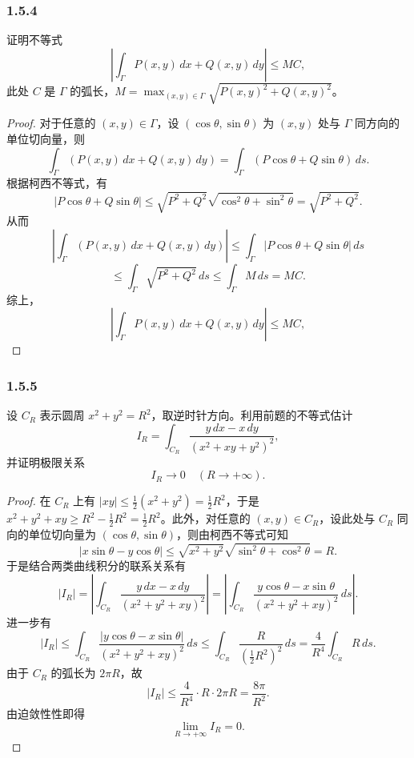 \documentclass[12pt]{ctexart}
\begin{document}
\subsubsection*{1.5.4}
证明不等式
\[
\left| \int_\Gamma P(x, y) \, dx + Q(x, y) \, dy \right| \leq M C,
\]
此处 $C$ 是 $\Gamma$ 的弧长，$M = \max_{(x, y) \in \Gamma} \sqrt{P(x, y)^2 + Q(x, y)^2}$。

\begin{proof}
	对于任意的 $(x, y) \in \Gamma$，设 $(\cos \theta, \sin \theta)$ 为 $(x, y)$ 处与 $\Gamma$ 同方向的单位切向量，则
\[
\int_\Gamma \left( P(x, y) \, dx + Q(x, y) \, dy \right) = \int_\Gamma \left( P \cos \theta + Q \sin \theta \right) \, ds.
\]
根据柯西不等式，有
\[
|P \cos \theta + Q \sin \theta| \leq \sqrt{P^2 + Q^2} \sqrt{\cos^2 \theta + \sin^2 \theta} = \sqrt{P^2 + Q^2}.
\]
从而
\[
\left| \int_\Gamma \left( P(x, y) \, dx + Q(x, y) \, dy \right) \right| 
\leq \int_\Gamma \left| P \cos \theta + Q \sin \theta \right| \, ds
\]
\[
\leq \int_\Gamma \sqrt{P^2 + Q^2} \, ds \leq \int_\Gamma M \, ds = MC.
\]
综上，
\[
\left| \int_\Gamma P(x, y) \, dx + Q(x, y) \, dy \right| \leq M C,
\]
\end{proof}

\subsubsection*{1.5.5}
设 $C_R$ 表示圆周 $x^2 + y^2 = R^2$，取逆时针方向。利用前题的不等式估计
\[
I_R = \int_{C_R} \frac{y \, dx - x \, dy}{(x^2 + xy + y^2)^2},
\]
并证明极限关系
\[
I_R \to 0 \quad (R \to +\infty).
\]

\begin{proof}
	在 $C_R$ 上有 $|xy| \leq \frac{1}{2}(x^2 + y^2) = \frac{1}{2}R^2$，于是 $x^2 + y^2 + xy \geq R^2 - \frac{1}{2}R^2 = \frac{1}{2}R^2$。此外，对任意的 $(x, y) \in C_R$，设此处与 $C_R$ 同向的单位切向量为 $(\cos \theta, \sin \theta)$，则由柯西不等式可知
\[
|x \sin \theta - y \cos \theta| \leq \sqrt{x^2 + y^2} \sqrt{\sin^2 \theta + \cos^2 \theta} = R.
\]
于是结合两类曲线积分的联系关系有
\[
|I_R| = \left| \int_{C_R} \frac{y \, dx - x \, dy}{(x^2 + y^2 + xy)^2} \right| 
= \left| \int_{C_R} \frac{y \cos \theta - x \sin \theta}{(x^2 + y^2 + xy)^2} \, ds \right|.
\]
进一步有
\[
|I_R| \leq \int_{C_R} \frac{|y \cos \theta - x \sin \theta|}{(x^2 + y^2 + xy)^2} \, ds 
\leq \int_{C_R} \frac{R}{\left( \frac{1}{2}R^2 \right)^2} \, ds 
= \frac{4}{R^4} \int_{C_R} R \, ds.
\]
由于 $C_R$ 的弧长为 $2\pi R$，故
\[
|I_R| \leq \frac{4}{R^4} \cdot R \cdot 2\pi R = \frac{8\pi}{R^2}.
\]
由迫敛性性即得
\[
\lim_{R \to +\infty} I_R = 0.
\]
\end{proof}
\end{document}
